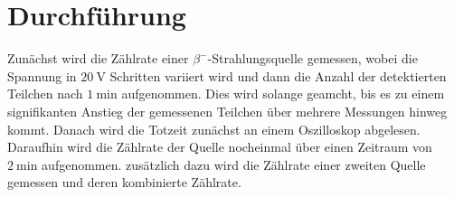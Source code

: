 \section{Durchführung}
\label{sec:Durchführung}

\noindent Zunächst wird die Zählrate einer $\beta^-$-Strahlungsquelle gemessen, wobei die Spannung in $\qty{20}{\volt}$ Schritten
variiert wird und dann die Anzahl der detektierten Teilchen nach $\qty{1}{\minute}$ aufgenommen. Dies wird solange 
geamcht, bis es zu einem signifikanten Anstieg der gemessenen Teilchen über mehrere Messungen hinweg kommt.
Danach wird die Totzeit zunächst an einem Oszilloskop abgelesen.\\

\noindent Daraufhin wird die Zählrate der Quelle nocheinmal über einen Zeitraum von $\qty{2}{\minute}$ aufgenommen.
zusätzlich dazu wird die Zählrate einer zweiten Quelle gemessen und deren kombinierte Zählrate.